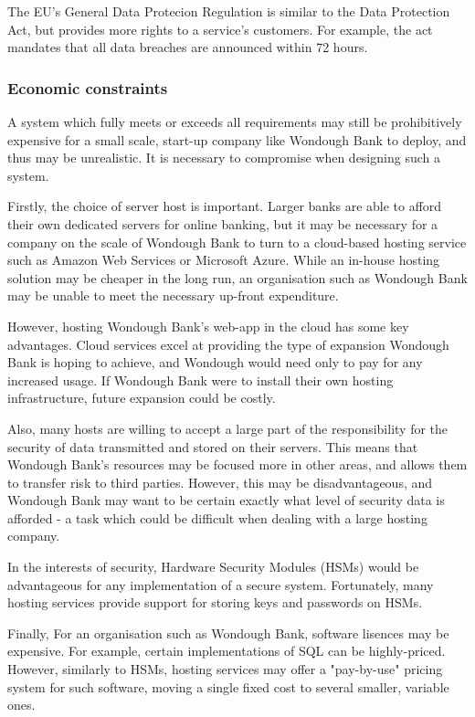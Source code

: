 The EU's General Data Protecion Regulation is similar to the Data Protection Act, but provides more rights to a service's customers. For example, the act mandates that all data breaches are announced within 72 hours.

\subsubsection{Economic constraints}

A system which fully meets or exceeds all requirements may still be prohibitively expensive for a small scale, start-up company like Wondough Bank to deploy, and thus may be unrealistic. It is necessary to compromise when designing such a system. 

Firstly, the choice of server host is important. Larger banks are able to afford their own dedicated servers for online banking, but it may be necessary for a company on the scale of Wondough Bank to turn to a cloud-based hosting service such as Amazon Web Services or Microsoft Azure. While an in-house hosting solution may be cheaper in the long run, an organisation such as Wondough Bank may be unable to meet the necessary up-front expenditure.

However, hosting Wondough Bank's web-app in the cloud has some key advantages. Cloud services excel at providing the type of expansion Wondough Bank is hoping to achieve, and Wondough would need only to pay for any increased usage. If Wondough Bank were to install their own hosting infrastructure, future expansion could be costly.

Also, many hosts are willing to accept a large part of the responsibility for the security of data transmitted and stored on their servers. This means that Wondough Bank's resources may be focused more in other areas, and allows them to transfer risk to third parties. However, this may be disadvantageous, and Wondough Bank may want to be certain exactly what level of security data is afforded - a task which could be difficult when dealing with a large hosting company.

In the interests of security, Hardware Security Modules (HSMs) would be advantageous for any implementation of a secure system. Fortunately, many hosting services provide support for storing keys and passwords on HSMs.

Finally, For an organisation such as Wondough Bank, software lisences may be expensive. For example, certain implementations of SQL can be highly-priced. However, similarly to HSMs, hosting services may offer a "pay-by-use" pricing system for such software, moving a single fixed cost to several smaller, variable ones.

